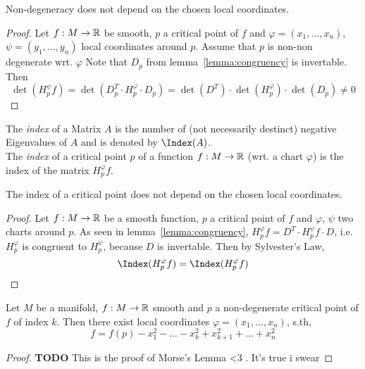 \begin{lemma} 
   \label{lemma:non-degeneracy}
   Non-degeneracy does not depend on the chosen local coordinates.
\end{lemma}

\begin{proof}
   Let $f: M \rightarrow {\mathbb R}$ be smooth, $p$ a critical point of $f$ and 
   $\varphi = (x_1, ..., x_n)$, $\psi = (y_1, ..., y_n)$ local coordinates 
   around $p$. Assume that $p$ is non-non degenerate wrt. $\varphi$ Note that 
   $D_p$ from lemma~\ref{lemma:congruency} is invertable. Then
   \[ \det(H_p^{\psi}f) = \det(D_p^T \cdot H_p^{\varphi} \cdot D_p) = 
   \det(D^T) \cdot \det(H_p^{\varphi}) \cdot \det(D_p) \neq 0 \]
\end{proof}

\begin{definition}[Index]
   \label{def:index}

   The \textit{index} of a Matrix $A$ is the number of (not necessarily 
   destinct) negative Eigenvalues of $A$ and is denoted by $\Index(A)$. \\
    The \textit{index} of a critical point $p$ of a function 
    $f: M \rightarrow {\mathbb R}$ (wrt. a chart $\varphi$) is the index of the matrix 
    $H_p^{\varphi}f$.
\end{definition}

\begin{lemma}
   \label{lemma:index}
   The index of a critical point does not depend on the chosen local coordinates.
\end{lemma}

\begin{proof}
   Let $f: M \rightarrow {\mathbb R}$ be a smooth function, $p$ a critical point of $f$
   and $\varphi$, $\psi$ two charts around $p$.
   As seen in lemma~\ref{lemma:congruency}, 
   $H_p^{\varphi}f = D^T \cdot H_p^{\psi}f \cdot D$, i.e.
   $H_p^{\varphi}$ is congruent to $H_p^{\psi}$, because $D$ is invertable. 
   Then by Sylvester's Law, 
   \[ \Index(H_p^{\varphi}f) = \Index(H_p^{\varphi}f) \]
\end{proof}

\begin{theorem}
   \label{theorem:morse lemma}

   Let $M$ be a manifold, $f: M \rightarrow {\mathbb R}$ smooth and $p$ a non-degenerate 
   critical point of $f$ of index $k$. Then there exist local coordinates 
   $\varphi = (x_1, ..., x_n)$, s.th,
   \[ f = f(p) - x_1^2 - ... - x_k^2 + x_{k+1}^2 + ... + x_n^2 \]
\end{theorem}

\begin{proof}
   \textbf{TODO}
   This is the proof of Morse's Lemma <3 . It's true i swear
\end{proof}
